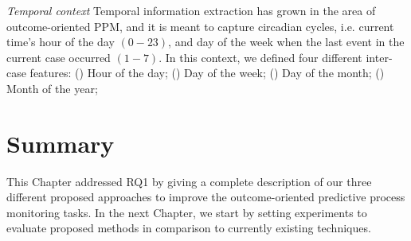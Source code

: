 \textit{Temporal context} Temporal information extraction has grown in the area of outcome-oriented PPM, and it is meant to capture circadian cycles, i.e. current time's hour of the day $(0-23)$, and day of the week when the last event in the current case occurred $(1-7)$. In this context, we defined four different inter-case features: () Hour of the day; () Day of the week; () Day of the month; () Month of the year; 



\section{Summary}
This Chapter addressed RQ1 by giving a complete description of our three different proposed approaches to improve the outcome-oriented predictive process monitoring tasks. In the next Chapter, we start by setting experiments to evaluate proposed methods in comparison to currently existing techniques. 




